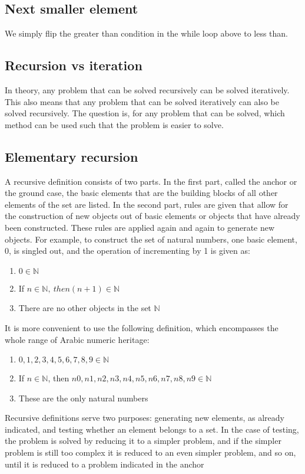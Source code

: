 \documentclass{report}
\begin{document}
    \pagebreak 
    \subsection{Next smaller element}
    \bigbreak \noindent 
    We simply flip the greater than condition in the while loop above to less than.



    \pagebreak 
    \bigbreak \noindent 
    \subsection{Recursion vs iteration}
    \bigbreak \noindent 
    In theory, any problem that can be solved recursively can be solved iteratively. This also means that any problem that can be solved iteratively can also be solved recursively.
    \bigbreak \noindent 
    The question is, for any problem that can be solved, which method can be used such that the problem is easier to solve.

    \pagebreak \bigbreak \noindent 
    \subsection{Elementary recursion}
    \bigbreak \noindent 
    A recursive definition consists of two parts. In the first part, called the anchor or
    the ground case, the basic elements that are the building blocks of all other elements
    of the set are listed. In the second part, rules are given that allow for the construction
    of new objects out of basic elements or objects that have already been constructed.
    These rules are applied again and again to generate new objects. For example, to construct the set of natural numbers, one basic element, 0, is singled out, and the operation of incrementing by 1 is given as:
    \begin{enumerate}
        \item $0 \in \mathbb{N}$
        \item If $n\in \mathbb{N},\ then (n+1) \in \mathbb{N}$
        \item There are no other objects in the set $\mathbb{N}$
    \end{enumerate}
    It is more convenient to use the following definition, which encompasses the whole range of Arabic numeric heritage:
    \begin{enumerate}
        \item $0, 1,2,3,4,5,6,7,8,9 \in \mathbb{N} $
        \item If $n\in \mathbb{N}$, then $n0, n1,n2,n3,n4,n5,n6,n7,n8,n9 \in \mathbb{N}$
        \item These are the only natural numbers
    \end{enumerate}
    \bigbreak \noindent 
    Recursive definitions serve two purposes: generating new elements, as already
    indicated, and testing whether an element belongs to a set. In the case of testing, the
    problem is solved by reducing it to a simpler problem, and if the simpler problem is
    still too complex it is reduced to an even simpler problem, and so on, until it is reduced to a problem indicated in the anchor
\end{document}
